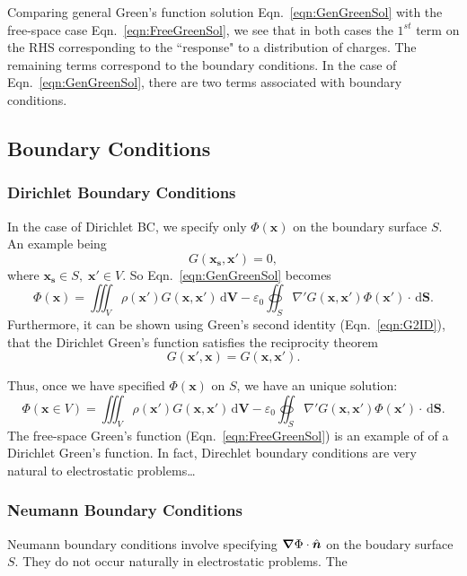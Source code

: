 \documentclass[12pt,english]{article}
\newcommand{\dmr}[1]{\, \mathrm{d}#1} %
\let\oldhat\hat
\renewcommand{\vec}[1]{\boldsymbol{#1}}
\renewcommand{\hat}[1]{\oldhat{\boldsymbol{#1}}}
\begin{document}
Comparing general Green's function solution Eqn.~\ref{eqn:GenGreenSol} with the free-space case Eqn.~\ref{eqn:FreeGreenSol}, we see that in both cases the $1^{st}$ term on the RHS corresponding to the ``response" to a distribution of charges. The remaining terms correspond to the boundary conditions. In the case of Eqn.~\ref{eqn:GenGreenSol}, there are two terms associated with boundary conditions.


\subsection{Boundary Conditions}

\subsubsection{Dirichlet Boundary Conditions}
In the case of Dirichlet BC, we specify only $\Phi(\vec{x})$ on the boundary surface $S$. An example being
\begin{equation}
    G(\vec{x_s}, \vec{x'}) = 0,
\end{equation}
where $\vec{x_s} \in S, \; \vec{x'} \in V$. So Eqn.~\ref{eqn:GenGreenSol} becomes
\begin{equation*}
    \Phi(\vec{x}) = \iiint_V \rho(\vec{x'})G(\vec{x}, \vec{x'}) \dmr{\vec{V}} - \varepsilon_0 \oiint_S\nabla'G(\vec{x}, \vec{x'})\Phi(\vec{x'})\cdot\dmr{\vec{S}}.
\end{equation*}
Furthermore, it can be shown using Green's second identity (Eqn.~\ref{eqn:G2ID}), that the Dirichlet Green's function satisfies the reciprocity theorem
\begin{equation}
    G(\vec{x'}, \vec{x}) = G(\vec{x}, \vec{x'}).
\end{equation}

Thus, once we have specified $\Phi(\vec{x})$ on $S$, we have an unique solution:
\begin{equation}
    \Phi(\vec{x} \in V) = \iiint_V \rho(\vec{x'})G(\vec{x}, \vec{x'}) \dmr{\vec{V}} - \varepsilon_0 \oiint_S\nabla'G(\vec{x}, \vec{x'})\Phi(\vec{x'})\cdot\dmr{\vec{S}}.
\end{equation}
The free-space Green's function (Eqn.~\ref{eqn:FreeGreenSol}) is an example of of a Dirichlet Green's function. In fact, Direchlet boundary conditions are very natural to electrostatic problems\dots

\subsubsection{Neumann Boundary Conditions}
Neumann boundary conditions involve specifying $\grad\Phi\cdot\hat{n}$ on the boudary surface $S$. They do not occur naturally in electrostatic problems. The
\end{document}

